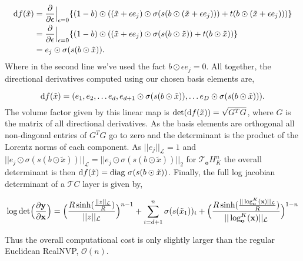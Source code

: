 \begin{align*}
    \textnormal{d}f(\tilde{x}) &= \frac{\partial}{\partial \epsilon} \Big |_{\epsilon=0}\{ (1 - b)\odot((\tilde{x} + \epsilon e_j) \odot \sigma(s(b \odot (\tilde{x} + \epsilon e_j))) + t(b \odot (\tilde{x} + \epsilon e_j)))\} \\
    &=  \frac{\partial}{\partial \epsilon} \Big |_{\epsilon=0}\{ (1 - b)\odot((\tilde{x} + \epsilon e_j) \odot \sigma(s(b \odot \tilde{x})) + t(b \odot \tilde{x}))\} \\
    &= e_j \odot \sigma(s(b \odot \tilde{x})).
\end{align*}
Where in the second line we've used the fact $b \odot \epsilon e_j = 0$. All together, the directional derivatives computed using our chosen basis elements are,

\begin{equation*}
    \textnormal{d}f(\tilde{x}) = (e_1, e_2, \dots e_d, e_{d+1}\odot \sigma(s(b \odot \tilde{x})), \dots e_{D}\odot \sigma(s(b \odot \tilde{x}))).
\end{equation*}
The volume factor given by this linear map is $\textnormal{det}( \textnormal{d}f(\tilde{x})) = \sqrt{G^TG}$, where $G$ is the matrix of all directional derivatives. As the basis elements are orthogonal all non-diagonal entries of $G^TG$ go to zero and the determinant is the product of the Lorentz norms of each component. As $||e_j||_{\mathcal{L}} =1$ and $||e_{j}\odot \sigma(s(b \odot \tilde{x}))||_{\mathcal{L}} = ||e_{j}\odot \sigma(s(b \odot \tilde{x}))||_2$ for $\mathcal{T}_{\mathbf{o}}H^n_K$ the overall determinant is then $\textnormal{d}f(\tilde{x}) = \textnormal{diag} \ \sigma(s(b \odot \tilde{x}))$. Finally, the full log jacobian determinant of a $\mathcal{T}C$ layer is given by,

\begin{equation}
    \log \textnormal{det}\Big (\frac{\partial \textbf{y}}{\partial \textbf{x}}\Big) = \Big(\frac{R\sinh(\frac{||z||_{\mathcal{L}}}{R})}{||z||_{\mathcal{L}}}\Big)^{n-1} + \sum_{i=d+1}^n\sigma(s(\tilde{x}_1))_i 
      + \Big(\frac{R\sinh(\frac{||\log^K_{\textbf{o}}(\textbf{x})||_{\mathcal{L}}}{R})}{||\log^K_{\textbf{o}}(\textbf{x})||_{\mathcal{L}}}\Big)^{1-n}
\end{equation}

Thus the overall computational cost is only slightly larger than the regular Euclidean RealNVP, $\mathcal{O}(n)$.

